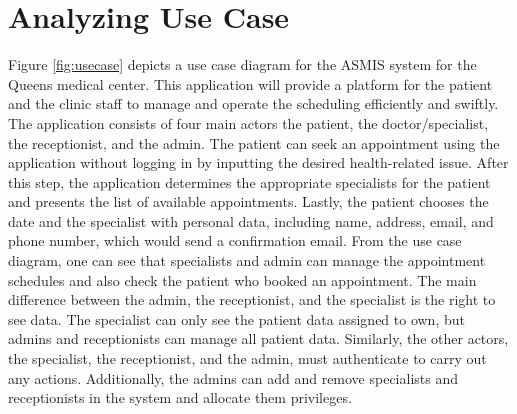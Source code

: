 \section{Analyzing Use Case}
Figure \ref{fig:usecase} depicts a use case diagram for the ASMIS system for the Queens medical center. This application will provide a platform for the patient and the clinic staff to manage and operate the scheduling efficiently and swiftly. \newline\newline
The application consists of four main actors the patient, the doctor/specialist, the receptionist, and the admin. The patient can seek an appointment using the application without logging in by inputting the desired health-related issue. After this step, the application determines the appropriate specialists for the patient and presents the list of available appointments. Lastly, the patient chooses the date and the specialist with personal data, including name, address, email, and phone number, which would send a confirmation email.\newline\newline
From the use case diagram, one can see that specialists and admin can manage the appointment schedules and also check the patient who booked an appointment. The main difference between the admin, the receptionist, and the specialist is the right to see data. The specialist can only see the patient data assigned to own, but admins and receptionists can manage all patient data. Similarly, the other actors, the specialist, the receptionist, and the admin, must authenticate to carry out any actions. Additionally, the admins can add and remove specialists and receptionists in the system and allocate them privileges. 